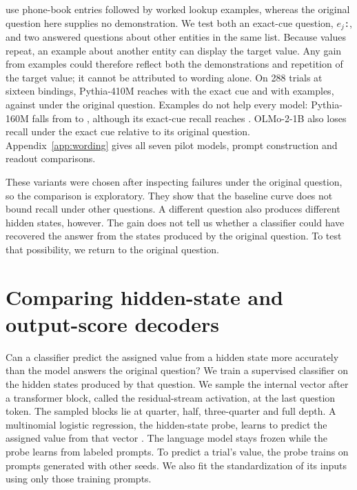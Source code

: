 \documentclass{article}
\begin{document}
\citet{jelassi2024} use phone-book entries followed by worked lookup examples, whereas the original question here supplies no demonstration.
We test both an exact-cue question, \texttt{$e_j$:}, and two answered questions about other entities in the same list.
Because values repeat, an example about another entity can display the target value.
Any gain from examples could therefore reflect both the demonstrations and repetition of the target value; it cannot be attributed to wording alone.
On 288 trials at sixteen bindings, Pythia-410M reaches \NewPilotFourTenExact{} with the exact cue and \NewPilotFourTenExamples{} with examples, against \NewPilotFourTenOriginal{} under the original question.
Examples do not help every model: Pythia-160M falls from \NewPilotSmallOriginal{} to \NewPilotSmallExamples{}, although its exact-cue recall reaches \NewPilotSmallExact{}.
OLMo-2-1B also loses recall under the exact cue relative to its original question.
Appendix~\ref{app:wording} gives all seven pilot models, prompt construction and readout comparisons.

These variants were chosen after inspecting failures under the original question, so the comparison is exploratory.
They show that the baseline curve does not bound recall under other questions.
A different question also produces different hidden states, however.
The gain does not tell us whether a classifier could have recovered the answer from the states produced by the original question.
To test that possibility, we return to the original question.

\section{Comparing hidden-state and output-score decoders}\label{sec:hidden}
Can a classifier predict the assigned value from a hidden state more accurately than the model answers the original question?
We train a supervised classifier on the hidden states produced by that question.
We sample the internal vector after a transformer block, called the residual-stream activation, at the last question token.
The sampled blocks lie at quarter, half, three-quarter and full depth.
A multinomial logistic regression, the hidden-state probe, learns to predict the assigned value from that vector \citep{alain2016}.
The language model stays frozen while the probe learns from labeled prompts.
To predict a trial's value, the probe trains on prompts generated with other seeds.
We also fit the standardization of its inputs using only those training prompts.
\end{document}
